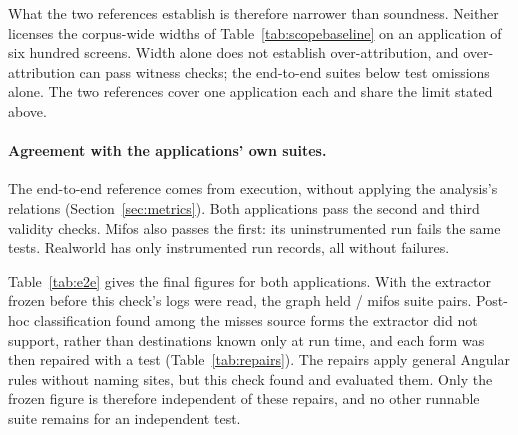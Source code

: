 What the two references establish is therefore narrower than soundness. Neither licenses the
corpus-wide widths of Table~\ref{tab:scopebaseline} on an application of six hundred screens.
Width alone does not establish over-attribution, and over-attribution can pass witness checks;
the end-to-end suites below test omissions alone. The two references cover one application each and share the limit stated above.

\paragraph{Agreement with the applications' own suites.}
\label{sec:res-e2e}

The end-to-end reference comes from execution, without applying the analysis's relations
(Section~\ref{sec:metrics}). Both applications pass the second and third validity checks. Mifos
also passes the first: its uninstrumented run fails the same tests. Realworld has only instrumented
run records, all without failures.

Table~\ref{tab:e2e} gives the final figures for both applications.
With the extractor frozen before this check's logs were read, the graph held
\EtoEMifosHitUnfixed{}/\EtoEMifosPairs{} mifos suite pairs. Post-hoc classification found among the
misses source forms the extractor did not support, rather than destinations known only at run
time, and each form was then repaired with a test (Table~\ref{tab:repairs}). The repairs apply
general Angular rules without naming sites, but this check found and evaluated them. Only the frozen
figure is therefore independent of these repairs, and no other runnable suite remains for an
independent test.

